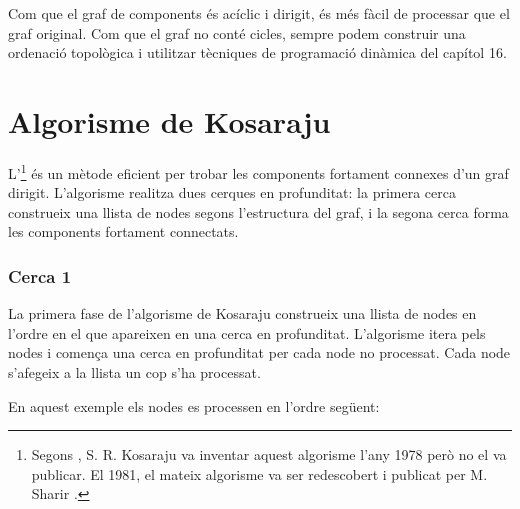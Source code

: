 Com que el graf de components és acíclic i dirigit, és més fàcil de
processar que el graf original. Com que el graf no conté cicles,
sempre podem construir una ordenació topològica i utilitzar tècniques
de programació dinàmica del capítol 16.

\section{Algorisme de Kosaraju}


L'\footnote{Segons \cite{aho83},
S. R. Kosaraju va inventar aquest algorisme l'any 1978 però no el va
publicar. El 1981, el mateix algorisme va ser redescobert i publicat
per M. Sharir \cite{sha81}.} és un mètode eficient per trobar les
components fortament connexes d'un graf dirigit. L'algorisme
realitza dues cerques en profunditat: la primera cerca construeix una
llista de nodes segons l'estructura del graf, i la segona cerca forma
les components fortament connectats.

\subsubsection{Cerca 1}

La primera fase de l'algorisme de Kosaraju construeix una llista de
nodes en l'ordre en el que apareixen en una cerca en
profunditat. L'algorisme itera pels nodes i comença una cerca en
profunditat per cada node no processat. Cada node s'afegeix a la llista
un cop s'ha processat.

En aquest exemple els nodes es processen en l'ordre següent:
\begin{center}
\end{center}


